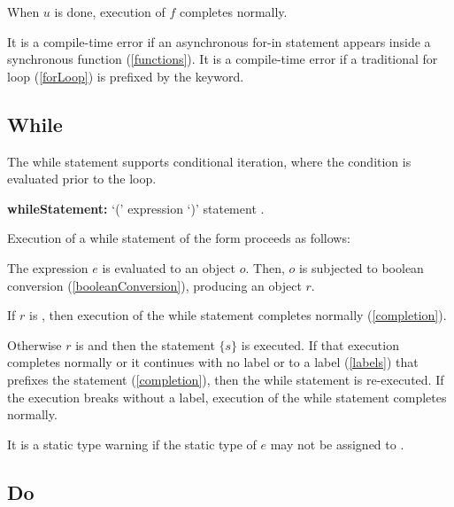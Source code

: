 \documentclass{article}
\begin{document}
\LMHash{}
When $u$ is done, execution of $f$ completes normally.

\LMHash{}
It is a compile-time error if an asynchronous for-in statement appears inside a synchronous function (\ref{functions}).
It is a compile-time error if a traditional for loop (\ref{forLoop}) is prefixed by the \AWAIT{} keyword.



\subsection{While}

\LMHash{}
The while statement supports conditional iteration, where the condition is evaluated prior to the loop.

\begin{grammar}
{\bf whileStatement:}\WHILE{} `(' expression `)' statement
  .
\end{grammar}

\LMHash{}
Execution of a while statement of the form  proceeds as follows:

\LMHash{}
The expression $e$ is evaluated to an object $o$.
Then, $o$ is subjected to boolean conversion (\ref{booleanConversion}), producing an object $r$.

\LMHash{}
If $r$ is \FALSE{}, then execution of the while statement completes normally (\ref{completion}).

\LMHash{}
Otherwise $r$ is \TRUE{} and then the statement $\{s\}$ is executed.
If that execution completes normally or it continues with no label or to a label (\ref{labels}) that prefixes the \WHILE{} statement (\ref{completion}), then the while statement is re-executed.
If the execution breaks without a label, execution of the while statement completes normally.

\LMHash{}
It is a static type warning if the static type of $e$ may not be assigned to .


\subsection{Do}
\end{document}
